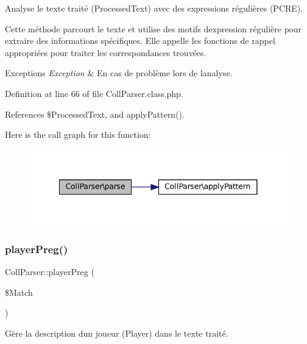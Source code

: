 Analyse le texte traité (Processed\+Text) avec des expressions régulières (P\+C\+RE).

Cette méthode parcourt le texte et utilise des motifs d\textquotesingle{}expression régulière pour extraire des informations spécifiques. Elle appelle les fonctions de rappel appropriées pour traiter les correspondances trouvées.


\begin{DoxyExceptions}{Exceptions}
{\em Exception} & En cas de problème lors de l\textquotesingle{}analyse. \\
\hline
\end{DoxyExceptions}


Definition at line 66 of file Coll\+Parser.\+class.\+php.



References \$\+Processed\+Text, and apply\+Pattern().

Here is the call graph for this function\+:\nopagebreak
\begin{figure}[H]
\begin{center}
\leavevmode
\includegraphics[width=341pt]{class_coll_parser_abdc6979cbc41f9b90e1cf6602d95cefa_cgraph}
\end{center}
\end{figure}
\mbox{\label{class_coll_parser_aa9797be8edfc480ed489ff5a68a8fd92}} 
\subsubsection{\texorpdfstring{player\+Preg()}{playerPreg()}}
{\footnotesize\ttfamily Coll\+Parser\+::player\+Preg (\begin{DoxyParamCaption}\item[{}]{\$\+Match }\end{DoxyParamCaption})\hspace{0.3cm}{\ttfamily [protected]}}

Gère la description d\textquotesingle{}un joueur (Player) dans le texte traité.


